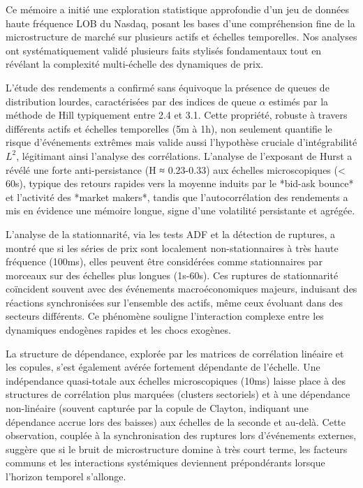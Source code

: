 \documentclass[10pt,a4paper]{article}
\theoremstyle{definition}
\theoremstyle{remark}
\begin{document}
\begin{itemize}
Ce mémoire a initié une exploration statistique approfondie d'un jeu de données haute fréquence LOB du Nasdaq, posant les bases d'une compréhension fine de la microstructure de marché sur plusieurs actifs et échelles temporelles. Nos analyses ont systématiquement validé plusieurs faits stylisés fondamentaux tout en révélant la complexité multi-échelle des dynamiques de prix.

L'étude des rendements a confirmé sans équivoque la présence de queues de distribution lourdes, caractérisées par des indices de queue $\alpha$ estimés par la méthode de Hill typiquement entre 2.4 et 3.1. Cette propriété, robuste à travers différents actifs et échelles temporelles (5m à 1h), non seulement quantifie le risque d'événements extrêmes mais valide aussi l'hypothèse cruciale d'intégrabilité $L^2$, légitimant ainsi l'analyse des corrélations. L'analyse de l'exposant de Hurst a révélé une forte anti-persistance (H ≈ 0.23-0.33) aux échelles microscopiques (< 60s), typique des retours rapides vers la moyenne induits par le *bid-ask bounce* et l'activité des *market makers*, tandis que l'autocorrélation des rendements a mis en évidence une mémoire longue, signe d'une volatilité persistante et agrégée.

L'analyse de la stationnarité, via les tests ADF et la détection de ruptures, a montré que si les séries de prix sont localement non-stationnaires à très haute fréquence (100ms), elles peuvent être considérées comme stationnaires par morceaux sur des échelles plus longues (1s-60s). Ces ruptures de stationnarité coïncident souvent avec des événements macroéconomiques majeurs, induisant des réactions synchronisées sur l'ensemble des actifs, même ceux évoluant dans des secteurs différents. Ce phénomène souligne l'interaction complexe entre les dynamiques endogènes rapides et les chocs exogènes.

La structure de dépendance, explorée par les matrices de corrélation linéaire et les copules, s'est également avérée fortement dépendante de l'échelle. Une indépendance quasi-totale aux échelles microscopiques (10ms) laisse place à des structures de corrélation plus marquées (clusters sectoriels) et à une dépendance non-linéaire (souvent capturée par la copule de Clayton, indiquant une dépendance accrue lors des baisses) aux échelles de la seconde et au-delà. Cette observation, couplée à la synchronisation des ruptures lors d'événements externes, suggère que si le bruit de microstructure domine à très court terme, les facteurs communs et les interactions systémiques deviennent prépondérants lorsque l'horizon temporel s'allonge.


\end{itemize}
\end{document}
